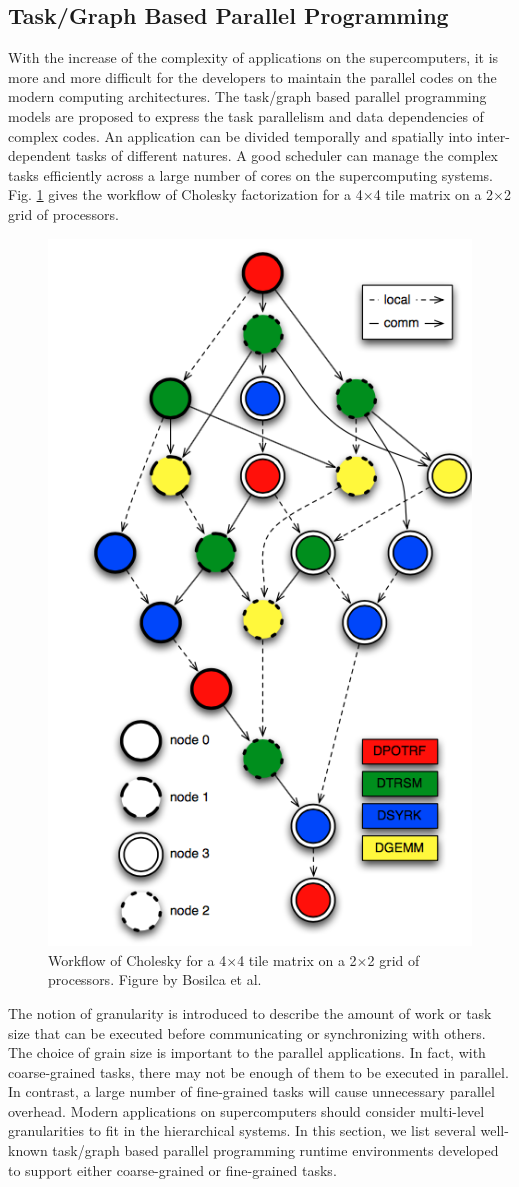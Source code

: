 \subsection{Task/Graph Based Parallel Programming}

With the increase of the complexity of applications on the supercomputers, it is more and more difficult for the developers to maintain the parallel codes on the modern computing architectures. The task/graph based parallel programming models are proposed to express the task parallelism and data dependencies of complex codes. An application can be divided temporally and spatially into inter-dependent tasks of different natures. A good scheduler can manage the complex tasks efficiently across a large number of cores on the supercomputing systems.  Fig. \ref{fig:workflow_cholesky} \cite{bosilca2012dague} gives the workflow of Cholesky factorization for a 4$\times$4 tile matrix on a 2$\times$2 grid of processors.

\begin{figure}[t]
	\centering
	\includegraphics[width=0.5\linewidth]{fig/workflow_cholesky.png}
	\caption{Workflow of Cholesky for a 4$\times$4 tile matrix on a 2$\times$2 grid of processors. Figure by Bosilca et al. \cite{bosilca2012dague}}
	\label{fig:workflow_cholesky}
\end{figure}

The notion of granularity is introduced to describe the amount of work or task size that can be executed before communicating or synchronizing with others. The choice of grain size is important to the parallel applications. In fact, with coarse-grained tasks, there may not be enough of them to be executed in parallel.  In contrast,  a large number of fine-grained tasks will cause unnecessary parallel overhead.  Modern applications on supercomputers should consider multi-level granularities to fit in the hierarchical systems. In this section, we list several well-known task/graph based parallel programming runtime environments developed to support either coarse-grained or fine-grained tasks.

